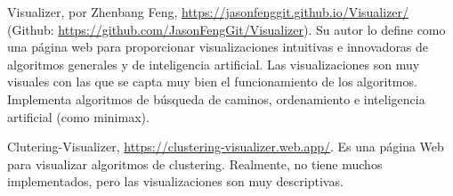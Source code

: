 Visualizer, por Zhenbang Feng, \url{https://jasonfenggit.github.io/Visualizer/}
(Github: \url{https://github.com/JasonFengGit/Visualizer}). Su autor lo define
como una página web para proporcionar visualizaciones intuitivas e innovadoras
de algoritmos generales y de inteligencia artificial. Las visualizaciones son
muy visuales con las que se capta muy bien el funcionamiento de los algoritmos.
Implementa algoritmos de búsqueda de caminos, ordenamiento e inteligencia
artificial (como minimax).

Clutering-Visualizer, \url{https://clustering-visualizer.web.app/}. Es una
página Web para visualizar algoritmos de clustering. Realmente, no tiene muchos
implementados, pero las visualizaciones son muy descriptivas.



